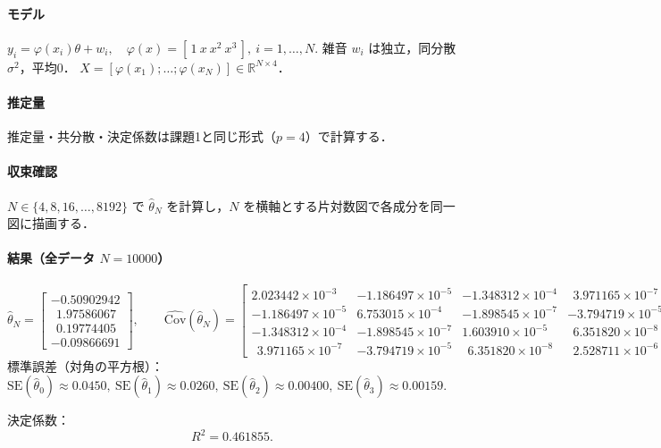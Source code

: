\paragraph{モデル}
$y_i=\varphi(x_i)\theta+w_i,\quad \varphi(x)=[\,1\ x\ x^2\ x^3\,],\ i=1,\dots,N.$
雑音 $w_i$ は独立，同分散 $\sigma^2$，平均0．
$X=[\varphi(x_1);\dots;\varphi(x_N)]\in\mathbb{R}^{N\times4}$．

\paragraph{推定量}
推定量・共分散・決定係数は課題1と同じ形式（$p=4$）で計算する．

\paragraph{収束確認}
$N\in\{4,8,16,\dots,8192\}$ で $\hat\theta_N$ を計算し，$N$ を横軸とする片対数図で各成分を同一図に描画する．

\paragraph{結果（全データ $N=10000$）}
\[
\hat\theta_N=\begin{bmatrix}
-0.50902942\\
\ \ 1.97586067\\
\ \ 0.19774405\\
-0.09866691
\end{bmatrix},\qquad
\widehat{\mathrm{Cov}}(\hat\theta_N)=\begin{bmatrix}
2.023442\times10^{-3} & -1.186497\times10^{-5} & -1.348312\times10^{-4} & \ \ 3.971165\times10^{-7}\\
-1.186497\times10^{-5} & 6.753015\times10^{-4} & -1.898545\times10^{-7} & -3.794719\times10^{-5}\\
-1.348312\times10^{-4} & -1.898545\times10^{-7} & 1.603910\times10^{-5} & \ \ 6.351820\times10^{-8}\\
\ \ 3.971165\times10^{-7} & -3.794719\times10^{-5} & \ \ 6.351820\times10^{-8} & \ \ 2.528711\times10^{-6}
\end{bmatrix}.
\]
標準誤差（対角の平方根）：
$\mathrm{SE}(\hat\theta_0)\approx0.0450,\ 
\mathrm{SE}(\hat\theta_1)\approx0.0260,\ 
\mathrm{SE}(\hat\theta_2)\approx0.00400,\ 
\mathrm{SE}(\hat\theta_3)\approx0.00159.$

決定係数：
\[
R^2=0.461855 .
\]

